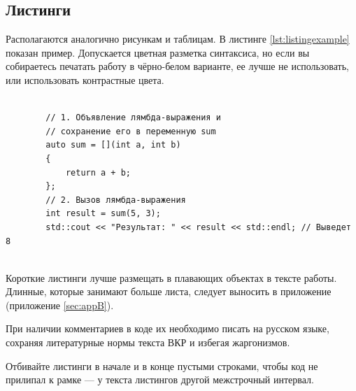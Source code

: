 \subsection{Листинги}

Располагаются аналогично рисункам и таблицам. В листинге \ref{lst:listingexample} показан пример. Допускается цветная разметка синтаксиса, но если вы собираетесь печатать работу в чёрно-белом варианте, ее лучше не использовать, или использовать контрастные цвета. 

\begin{listing}
	\caption{Пример}
	\label{lst:listingexample}
	\begin{verbatim}
		
		// 1. Объявление лямбда-выражения и 
		// сохранение его в переменную sum
		auto sum = [](int a, int b) 
		{
			return a + b;
		};		
		// 2. Вызов лямбда-выражения
		int result = sum(5, 3);
		std::cout << "Результат: " << result << std::endl; // Выведет 8	
	
	\end{verbatim} 
\end{listing}



Короткие листинги лучше размещать в плавающих объектах в тексте работы. Длинные, которые занимают больше листа, следует выносить в приложение (приложение \ref{sec:appB}). 

При наличии комментариев в коде их необходимо писать на русском языке, сохраняя литературные нормы текста ВКР и избегая жаргонизмов.

Отбивайте листинги в начале и в конце пустыми строками, чтобы код не прилипал к рамке --- у текста листингов другой межстрочный интервал.